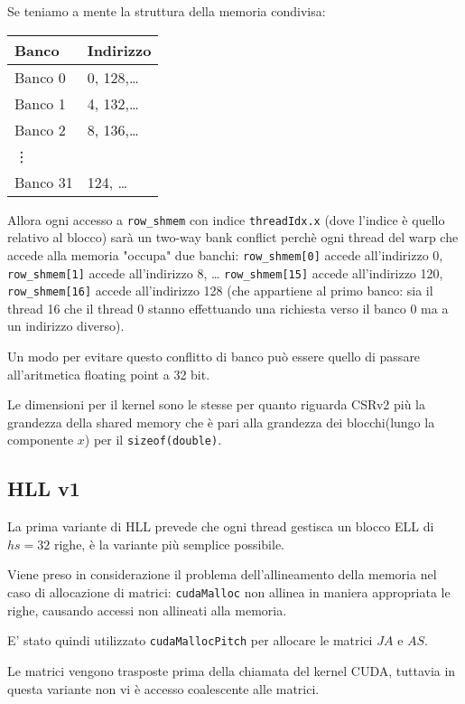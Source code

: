 \documentclass[a4paper,9pt]{extarticle}
\begin{document}
Se teniamo a mente la struttura della memoria condivisa:

\begin{minipage}{\linewidth}
\centering
\begin{tabular}{|l l|}
\hline
\textbf{Banco} & \textbf{Indirizzo} \\
\hline
\hline
Banco 0 & 0, 128,\dots \\
Banco 1 & 4, 132,\dots \\
Banco 2 & 8, 136,\dots \\
\hline
\vdots & \\
\hline
Banco 31 & 124, \dots \\
\hline
\end{tabular}
\end{minipage}

Allora ogni accesso a \texttt{row\_shmem} con indice \texttt{threadIdx.x} (dove l'indice è quello relativo al blocco) sarà 
un two-way bank conflict perchè ogni thread del warp che accede alla memoria "occupa" due banchi:
\texttt{row\_shmem[0]} accede all'indirizzo 0, \texttt{row\_shmem[1]} accede all'indirizzo 8, \dots
\texttt{row\_shmem[15]} accede all'indirizzo 120, \texttt{row\_shmem[16]} accede all'indirizzo 128 (che appartiene al
primo banco: sia il thread 16 che il thread 0 stanno effettuando una richiesta verso il banco 0 ma a un indirizzo 
diverso).

Un modo per evitare questo conflitto di banco può essere quello di passare all'aritmetica floating point a 32 bit.

Le dimensioni per il kernel sono le stesse per quanto riguarda CSRv2 più la grandezza della shared memory che è pari
alla grandezza dei blocchi(lungo la componente $x$) per il \texttt{sizeof(double)}.

\subsection{HLL v1}
La prima variante di HLL prevede che ogni thread gestisca un blocco ELL di $hs=32$ righe, è la variante più semplice
possibile.

Viene preso in considerazione il problema dell'allineamento della memoria nel caso di allocazione di matrici:
\texttt{cudaMalloc} non allinea in maniera appropriata le righe, causando accessi non allineati alla memoria.

E' stato quindi utilizzato \texttt{cudaMallocPitch} per allocare le matrici $JA$ e $AS$.

Le matrici vengono trasposte prima della chiamata del kernel CUDA, tuttavia in questa variante non vi è accesso
coalescente alle matrici.
\end{document}

